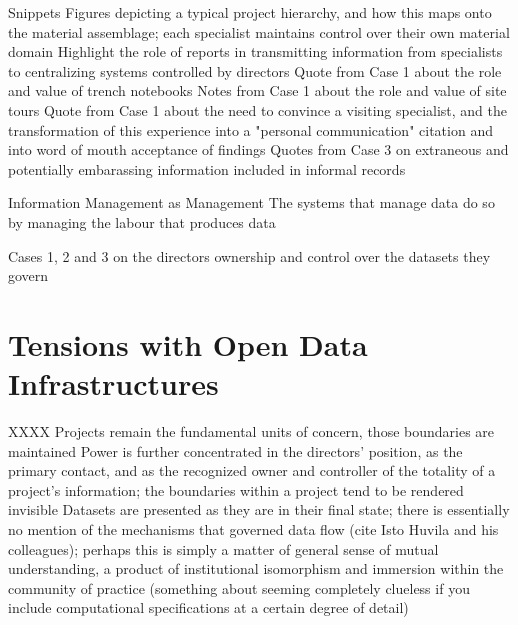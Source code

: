 \documentclass{beamer}
\begin{document}
\begin{frame}{Snippets}
  Figures depicting a typical project hierarchy, and how this maps onto the material assemblage; each specialist maintains control over their own material domain
  Highlight the role of reports in transmitting information from specialists to centralizing systems controlled by directors
  Quote from Case 1 about the role and value of trench notebooks
  Notes from Case 1 about the role and value of site tours
  Quote from Case 1 about the need to convince a visiting specialist, and the transformation of this experience into a "personal communication" citation and into word of mouth acceptance of findings
  Quotes from Case 3 on extraneous and potentially embarassing information included in informal records
  

\end{frame}


\begin{frame}{Information Management as Management}
  The systems that manage data do so by managing the labour that produces data

\end{frame}

\begin{frame}
  Cases 1, 2 and 3 on the directors ownership and control over the datasets they govern

\end{frame}

\section{Tensions with Open Data Infrastructures}

\begin{frame}{XXXX}
  Projects remain the fundamental units of concern, those boundaries are maintained
  Power is further concentrated in the directors' position, as the primary contact, and as the recognized owner and controller of the totality of a project's information; the boundaries within a project tend to be rendered invisible
  Datasets are presented as they are in their final state; there is essentially no mention of the mechanisms that governed data flow (cite Isto Huvila and his colleagues); perhaps this is simply a matter of general sense of mutual understanding, a product of institutional isomorphism and immersion within the community of practice (something about seeming completely clueless if you include computational specifications at a certain degree of detail)

\end{frame}
\end{document}
